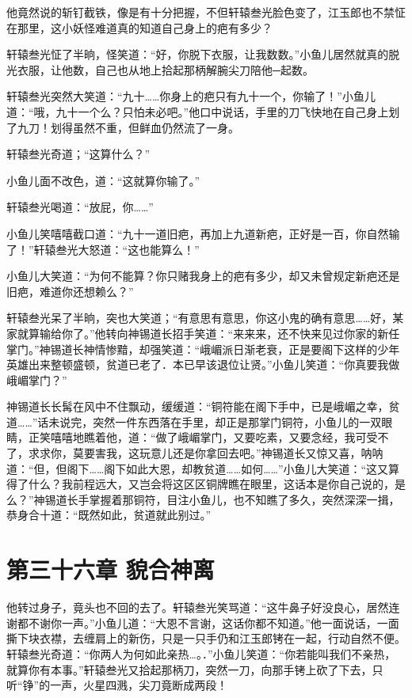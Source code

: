\documentclass[12pt,oneside]{book}
\begin{document}
他竟然说的斩钉截铁，像是有十分把握，不但轩辕叁光脸色变了，江玉郎也不禁怔在那里，这小妖怪难道真的知道自己身上的疤有多少？

轩辕叁光怔了半晌，怪笑道：``好，你脱下衣服，让我数数。''小鱼儿居然就真的脱光衣服，让他数，自己也从地上拾起那柄解腕尖刀陪他─起数。

轩辕叁光突然大笑道：``九十\ldots\ldots 你身上的疤只有九十一个，你输了！''小鱼儿道：``哦，九十一个么？只怕未必吧。''他口中说话，手里的刀飞快地在自己身上划了九刀！划得虽然不重，但鲜血仍然流了一身。

轩辕叁光奇道；``这算什么？''

小鱼儿面不改色，道：``这就算你输了。''

轩辕叁光喝道：``放屁，你\ldots\ldots{}''

小鱼儿笑嘻嘻截口道：``九十一道旧疤，再加上九道新疤，正好是一百，你自然输了！''轩辕叁光大怒道：``这也能算么！''

小鱼儿大笑道：``为何不能算？你只赌我身上的疤有多少，却又未曾规定新疤还是旧疤，难道你还想赖么？''

轩辕叁光呆了半晌，突也大笑道；``有意思有意思，你这小鬼的确有意思\ldots\ldots 好，某家就算输给你了。''他转向神锡道长招手笑道：``来来来，还不快来见过你家的新任掌门。''神锡道长神情惨黯，却强笑道：``峨嵋派日渐老衰，正是要阁下这样的少年英雄出来整顿盛顿，贫道已老了．本已早该退位让贤。''小鱼儿笑道：``你真要我做峨嵋掌门？''

神锡道长长髯在风中不住飘动，缓缓道：``铜符能在阁下手中，已是峨嵋之幸，贫道\ldots\ldots{}''话未说完，突然一件东西落在手里，却正是那掌门铜符，小鱼儿的一双眼睛，正笑嘻嘻地瞧着他，道：``做了峨嵋掌门，又要吃素，又要念经，我可受不了，求求你，莫要害我，这玩意儿还是你拿回去吧。''神锡道长又惊又喜，呐呐道：``但，但阁下\ldots\ldots 阁下如此大恩，却教贫道\ldots\ldots 如何\ldots\ldots{}''小鱼儿大笑道：``这又算得了什么？我前程远大，又岂会将这区区铜牌瞧在眼里，这话本是你自己说的，是么？''神锡道长手掌握着那铜符，目注小鱼儿，也不知瞧了多久，突然深深一揖，恭身合十道：``既然如此，贫道就此别过。''

\hypertarget{ux7b2cux4e09ux5341ux516dux7ae0-ux8c8cux5408ux795eux79bb}{%
\chapter{第三十六章
貌合神离}\label{ux7b2cux4e09ux5341ux516dux7ae0-ux8c8cux5408ux795eux79bb}}

他转过身子，竟头也不回的去了。轩辕叁光笑骂道：``这牛鼻子好没良心，居然连谢都不谢你一声。''小鱼儿道：``大恩不言谢，这话你都不知道。''他一面说话，一面撕下块衣襟，去缠肩上的新伤，只是一只手仍和江玉郎铐在一起，行动自然不便。轩辕叁光奇道：``你两人为何如此亲热\ldots。．''小鱼儿笑道：``你若能叫我们不亲热，就算你有本事。''轩辕叁光又拾起那柄刀，突然一刀，向那手铐上砍了下去，只听``铮''的一声，火星四溅，尖刀竟断成两段！
\end{document}

